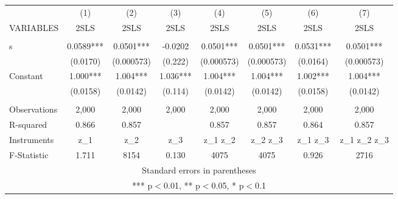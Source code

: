 \begin{tabular}{lccccccc} \hline
 & (1) & (2) & (3) & (4) & (5) & (6) & (7) \\
VARIABLES & 2SLS & 2SLS & 2SLS & 2SLS & 2SLS & 2SLS & 2SLS \\ \hline
 &  &  &  &  &  &  &  \\
s & 0.0589*** & 0.0501*** & -0.0202 & 0.0501*** & 0.0501*** & 0.0531*** & 0.0501*** \\
 & (0.0170) & (0.000573) & (0.222) & (0.000573) & (0.000573) & (0.0164) & (0.000573) \\
Constant & 1.000*** & 1.004*** & 1.036*** & 1.004*** & 1.004*** & 1.002*** & 1.004*** \\
 & (0.0158) & (0.0142) & (0.114) & (0.0142) & (0.0142) & (0.0158) & (0.0142) \\
 &  &  &  &  &  &  &  \\
Observations & 2,000 & 2,000 & 2,000 & 2,000 & 2,000 & 2,000 & 2,000 \\
R-squared & 0.866 & 0.857 &  & 0.857 & 0.857 & 0.864 & 0.857 \\
Instruments & z\_1 & z\_2 & z\_3 & z\_1 z\_2 & z\_2 z\_3 & z\_1 z\_3 & z\_1 z\_2 z\_3 \\
 F-Statistic & 1.711 & 8154 & 0.130 & 4075 & 4075 & 0.926 & 2716 \\ \hline
\multicolumn{8}{c}{ Standard errors in parentheses} \\
\multicolumn{8}{c}{ *** p$<$0.01, ** p$<$0.05, * p$<$0.1} \\
\end{tabular}
